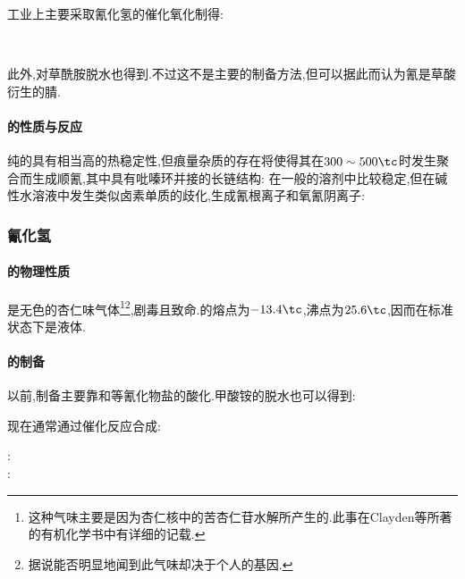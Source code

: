 \documentclass{ctexart}
\begin{document}
\indent 工业上主要采取氰化氢的催化氧化制得:
\begin{center}
    \\
\end{center}

\indent 此外,对草酰胺脱水也得到.不过这不是主要的制备方法,但可以据此而认为氰是草酸衍生的腈.
\begin{center}
\end{center}
\paragraph{的性质与反应}
纯的具有相当高的热稳定性,但痕量杂质的存在将使得其在$300\sim500\tc$时发生聚合而生成顺氰,其中具有吡嗪环并接的长链结构:
在一般的溶剂中比较稳定,但在碱性水溶液中发生类似卤素单质的歧化,生成氰根离子和氧氰阴离子:
\begin{center}
\end{center}
\subsubsection{氰化氢}
\paragraph{的物理性质}
是无色的杏仁味气体\footnote{这种气味主要是因为杏仁核中的苦杏仁苷水解所产生的.此事在Clayden等所著的有机化学书中有详细的记载.}\footnote{据说能否明显地闻到此气味却决于个人的基因.},剧毒且致命.的熔点为$-13.4\tc$,沸点为$25.6\tc$,因而在标准状态下是液体.
\paragraph{的制备}
以前,制备主要靠和等氰化物盐的酸化.甲酸铵的脱水也可以得到:
\begin{center}
\end{center}
现在通常通过催化反应合成:
\begin{center}
    :\ \\
    :\ 
\end{center}
\end{document}
